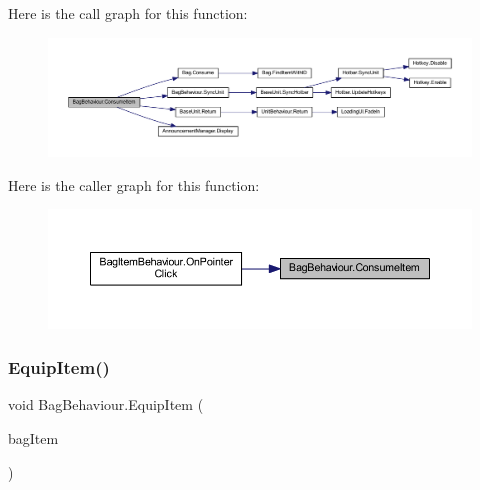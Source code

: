 Here is the call graph for this function\+:
\nopagebreak
\begin{figure}[H]
\begin{center}
\leavevmode
\includegraphics[width=350pt]{class_bag_behaviour_a407231bcd34e96129c9ae624a484a045_cgraph}
\end{center}
\end{figure}
Here is the caller graph for this function\+:
\nopagebreak
\begin{figure}[H]
\begin{center}
\leavevmode
\includegraphics[width=350pt]{class_bag_behaviour_a407231bcd34e96129c9ae624a484a045_icgraph}
\end{center}
\end{figure}
\mbox{\label{class_bag_behaviour_a472cbdd4764a3f7980c19d83b3789651}} 
\subsubsection{\texorpdfstring{EquipItem()}{EquipItem()}}
{\footnotesize\ttfamily void Bag\+Behaviour.\+Equip\+Item (\begin{DoxyParamCaption}\item[{\mbox{\hyperlink{class_bag_item_behaviour}{Bag\+Item\+Behaviour}}}]{bag\+Item }\end{DoxyParamCaption})}

